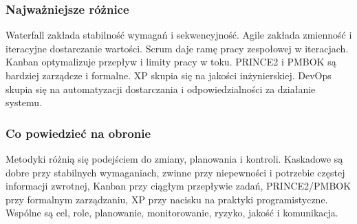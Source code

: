 \subsubsection{Najważniejsze różnice}

Waterfall zakłada stabilność wymagań i sekwencyjność. Agile zakłada zmienność i iteracyjne dostarczanie wartości. Scrum daje ramę pracy zespołowej w iteracjach. Kanban optymalizuje przepływ i limity pracy w toku. PRINCE2 i PMBOK są bardziej zarządcze i formalne. XP skupia się na jakości inżynierskiej. DevOps skupia się na automatyzacji dostarczania i odpowiedzialności za działanie systemu.

\subsubsection{Co powiedzieć na obronie}

Metodyki różnią się podejściem do zmiany, planowania i kontroli. Kaskadowe są dobre przy stabilnych wymaganiach, zwinne przy niepewności i potrzebie częstej informacji zwrotnej, Kanban przy ciągłym przepływie zadań, PRINCE2/PMBOK przy formalnym zarządzaniu, XP przy nacisku na praktyki programistyczne. Wspólne są cel, role, planowanie, monitorowanie, ryzyko, jakość i komunikacja.
